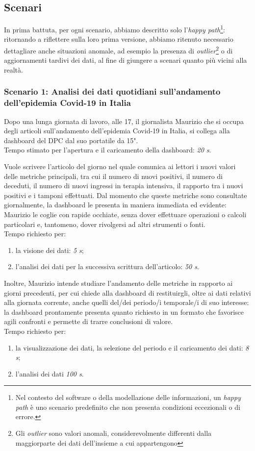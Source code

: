 \subsection{Scenari}
In prima battuta, per ogni scenario, abbiamo descritto solo l'\textit{happy path}\footnote{Nel contesto del software o della modellazione delle informazioni, un \textit{happy path} è uno scenario predefinito che non presenta condizioni eccezionali o di errore.}: ritornando a riflettere sulla loro prima versione, abbiamo ritenuto necessario dettagliare anche situazioni anomale, ad esempio la presenza di \textit{outlier}\footnote{Gli \textit{outlier} sono valori anomali, considerevolmente differenti dalla maggiorparte dei dati dell'insieme a cui appartengono} o di aggiornamenti tardivi dei dati, al fine di giungere a scenari quanto più vicini alla realtà.

\subsubsection*{Scenario 1: Analisi dei dati quotidiani sull'andamento dell'epidemia Covid-19 in Italia}
Dopo una lunga giornata di lavoro, alle 17, il giornalista Maurizio che si occupa degli articoli sull'andamento dell'epidemia Covid-19 in Italia, si collega alla dashboard del DPC dal suo portatile da 15".\\
Tempo stimato per l'apertura e il caricamento della dashboard: \textit{20 s}.

Vuole scrivere l'articolo del giorno nel quale comunica ai lettori i nuovi valori delle metriche principali, tra cui il numero di nuovi positivi, il numero di deceduti, il numero di nuovi ingressi in terapia intensiva, il rapporto tra i nuovi positivi e i tamponi effettuati. Dal momento che queste metriche sono consultate giornalmente, la dashboard le presenta in maniera immediata ed evidente: Maurizio le coglie con rapide occhiate, senza dover effettuare operazioni o calcoli particolari e, tantomeno, dover rivolgersi ad altri strumenti o fonti.\\
Tempo richiesto per:
\begin{enumerate}
    \item la visione dei dati: \textit{5 s};
    \item l'analisi dei dati per la successiva scrittura dell'articolo: \textit{50 s}.
\end{enumerate}

Inoltre, Maurizio intende studiare l'andamento delle metriche in rapporto ai giorni precedenti, per cui chiede alla dashboard di restituirgli, oltre ai dati relativi alla giornata corrente, anche quelli del/dei periodo/i temporale/i di suo interesse: la dashboard prontamente presenta quanto richiesto in un formato che favorisce agili confronti e permette di trarre conclusioni di valore.\\
Tempo richiesto per:
\begin{enumerate}
    \item la visualizzazione dei dati, la selezione del periodo e il caricamento dei dati: \textit{8 s};
    \item l'analisi dei dati \textit{100 s}.
\end{enumerate}

